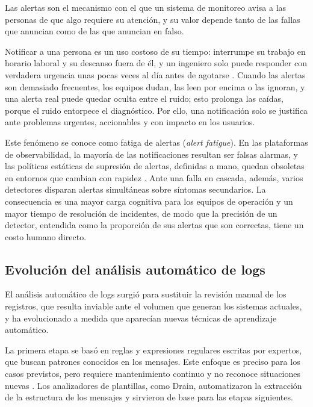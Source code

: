 Las alertas son el mecanismo con el que un sistema de monitoreo avisa a las personas de que algo requiere su atención, y su valor depende tanto de las fallas que anuncian como de las que anuncian en falso.

Notificar a una persona es un uso costoso de su tiempo: interrumpe su trabajo en horario laboral y su descanso fuera de él, y un ingeniero solo puede responder con verdadera urgencia unas pocas veces al día antes de agotarse \cite{ewaschuk2016_sre_monitoring}. Cuando las alertas son demasiado frecuentes, los equipos dudan, las leen por encima o las ignoran, y una alerta real puede quedar oculta entre el ruido; esto prolonga las caídas, porque el ruido entorpece el diagnóstico. Por ello, una notificación solo se justifica ante problemas urgentes, accionables y con impacto en los usuarios.

Este fenómeno se conoce como fatiga de alertas (\textit{alert fatigue}). En las plataformas de observabilidad, la mayoría de las notificaciones resultan ser falsas alarmas, y las políticas estáticas de supresión de alertas, definidas a mano, quedan obsoletas en entornos que cambian con rapidez \cite{bhukar2024_alertsuppression}. Ante una falla en cascada, además, varios detectores disparan alertas simultáneas sobre síntomas secundarios. La consecuencia es una mayor carga cognitiva para los equipos de operación y un mayor tiempo de resolución de incidentes, de modo que la precisión de un detector, entendida como la proporción de sus alertas que son correctas, tiene un costo humano directo.

\subsection{Evolución del análisis automático de logs}\label{sec:ant_evolucion_logs}

El análisis automático de logs surgió para sustituir la revisión manual de los registros, que resulta inviable ante el volumen que generan los sistemas actuales, y ha evolucionado a medida que aparecían nuevas técnicas de aprendizaje automático.

La primera etapa se basó en reglas y expresiones regulares escritas por expertos, que buscan patrones conocidos en los mensajes. Este enfoque es preciso para los casos previstos, pero requiere mantenimiento continuo y no reconoce situaciones nuevas \cite{he2021_survey}. Los analizadores de plantillas, como Drain, automatizaron la extracción de la estructura de los mensajes y sirvieron de base para las etapas siguientes.

